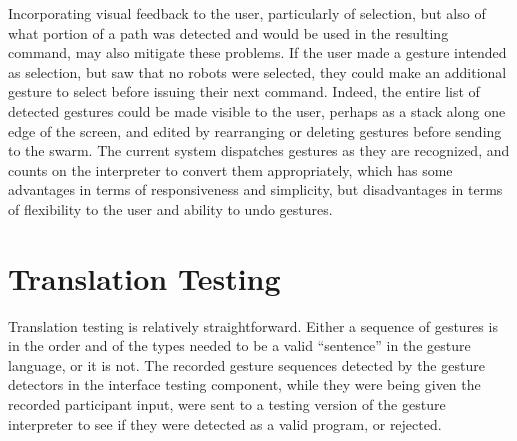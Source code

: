 Incorporating visual feedback to the user, particularly of selection, but also of what portion of a path was detected and would be used in the resulting command, may also mitigate these problems. 
If the user made a gesture intended as selection, but saw that no robots were selected, they could make an additional gesture to select before issuing their next command. 
Indeed, the entire list of detected gestures could be made visible to the user, perhaps as a stack along one edge of the screen, and edited by rearranging or deleting gestures before sending to the swarm. 
The current system dispatches gestures as they are recognized, and counts on the interpreter to convert them appropriately, which has some advantages in terms of responsiveness and simplicity, but disadvantages in terms of flexibility to the user and ability to undo gestures. 

\section{Translation Testing}

Translation testing is relatively straightforward. 
Either a sequence of gestures is in the order and of the types needed to be a valid ``sentence'' in the gesture language, or it is not. 
The recorded gesture sequences detected by the gesture detectors in the interface testing component, while they were being given the recorded participant input, were sent to a testing version of the gesture interpreter to see if they were detected as a valid program, or rejected. 

